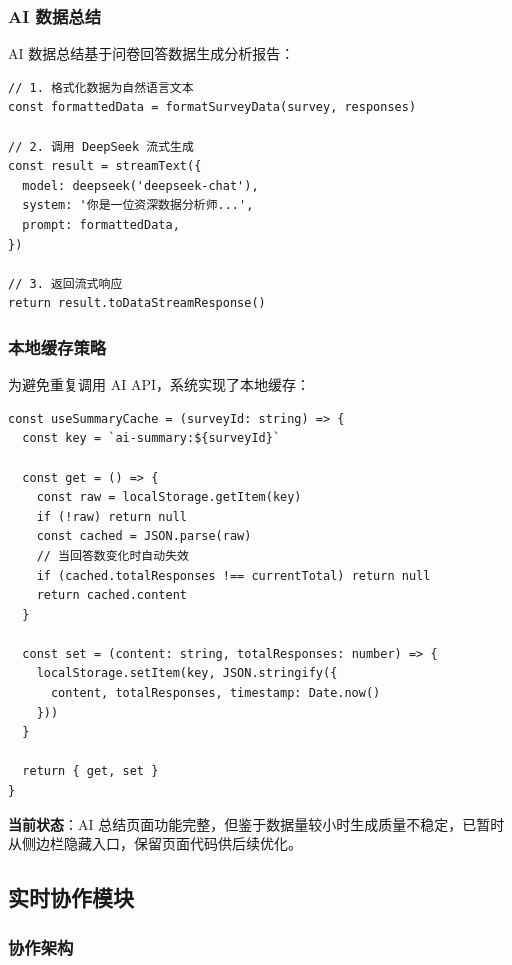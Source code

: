 \subsubsection{AI 数据总结}

AI 数据总结基于问卷回答数据生成分析报告：

\begin{verbatim}
// 1. 格式化数据为自然语言文本
const formattedData = formatSurveyData(survey, responses)

// 2. 调用 DeepSeek 流式生成
const result = streamText({
  model: deepseek('deepseek-chat'),
  system: '你是一位资深数据分析师...',
  prompt: formattedData,
})

// 3. 返回流式响应
return result.toDataStreamResponse()
\end{verbatim}

\subsubsection{本地缓存策略}

为避免重复调用 AI API，系统实现了本地缓存：

\begin{verbatim}
const useSummaryCache = (surveyId: string) => {
  const key = `ai-summary:${surveyId}`
  
  const get = () => {
    const raw = localStorage.getItem(key)
    if (!raw) return null
    const cached = JSON.parse(raw)
    // 当回答数变化时自动失效
    if (cached.totalResponses !== currentTotal) return null
    return cached.content
  }
  
  const set = (content: string, totalResponses: number) => {
    localStorage.setItem(key, JSON.stringify({
      content, totalResponses, timestamp: Date.now()
    }))
  }
  
  return { get, set }
}
\end{verbatim}

\textbf{当前状态}：AI 总结页面功能完整，但鉴于数据量较小时生成质量不稳定，已暂时从侧边栏隐藏入口，保留页面代码供后续优化。

\subsection{实时协作模块}

\subsubsection{协作架构}

